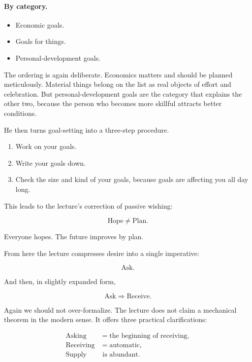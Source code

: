\paragraph{By category.}
\begin{itemize}
\item Economic goals.
\item Goals for things.
\item Personal-development goals.
\end{itemize}

The ordering is again deliberate. Economics matters and should be planned meticulously. Material things belong on the list as real objects of effort and celebration. But personal-development goals are the category that explains the other two, because the person who becomes more skillful attracts better conditions.

He then turns goal-setting into a three-step procedure.

\begin{enumerate}
\item Work on your goals.
\item Write your goals down.
\item Check the size and kind of your goals, because goals are affecting you all day long.
\end{enumerate}

This leads to the lecture's correction of passive wishing:

\begin{equation}
\text{Hope} \neq \text{Plan}.
\end{equation}

Everyone hopes. The future improves by plan.

From here the lecture compresses desire into a single imperative:

\begin{equation}
\text{Ask}.
\end{equation}

And then, in slightly expanded form,

\begin{equation}
\text{Ask} \Longrightarrow \text{Receive}.
\end{equation}

Again we should not over-formalize. The lecture does not claim a mechanical theorem in the modern sense. It offers three practical clarifications:

\begin{align}
\text{Asking} &= \text{the beginning of receiving},\\
\text{Receiving} &= \text{automatic},\\
\text{Supply} &\text{ is abundant.}
\end{align}

